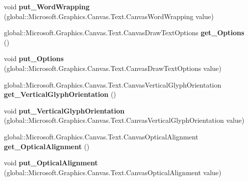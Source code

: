 \begin{DoxyCompactItemize}
void {\bfseries put\+\_\+\+Word\+Wrapping} (global\+::\+Microsoft.\+Graphics.\+Canvas.\+Text.\+Canvas\+Word\+Wrapping value)
\item 
\mbox{\label{interface_microsoft_1_1_graphics_1_1_canvas_1_1_text_1_1_i_canvas_text_format_a208378a52440f0dccacbf5a5208e2e6d}} 
global\+::\+Microsoft.\+Graphics.\+Canvas.\+Text.\+Canvas\+Draw\+Text\+Options {\bfseries get\+\_\+\+Options} ()
\item 
\mbox{\label{interface_microsoft_1_1_graphics_1_1_canvas_1_1_text_1_1_i_canvas_text_format_a2f0c996edcd441c91461fbf033bf1203}} 
void {\bfseries put\+\_\+\+Options} (global\+::\+Microsoft.\+Graphics.\+Canvas.\+Text.\+Canvas\+Draw\+Text\+Options value)
\item 
\mbox{\label{interface_microsoft_1_1_graphics_1_1_canvas_1_1_text_1_1_i_canvas_text_format_abc2a32d3aacea2f49232cd218d252da8}} 
global\+::\+Microsoft.\+Graphics.\+Canvas.\+Text.\+Canvas\+Vertical\+Glyph\+Orientation {\bfseries get\+\_\+\+Vertical\+Glyph\+Orientation} ()
\item 
\mbox{\label{interface_microsoft_1_1_graphics_1_1_canvas_1_1_text_1_1_i_canvas_text_format_a4f0382db5faf99e239642e76ec8e2269}} 
void {\bfseries put\+\_\+\+Vertical\+Glyph\+Orientation} (global\+::\+Microsoft.\+Graphics.\+Canvas.\+Text.\+Canvas\+Vertical\+Glyph\+Orientation value)
\item 
\mbox{\label{interface_microsoft_1_1_graphics_1_1_canvas_1_1_text_1_1_i_canvas_text_format_a6266ab0128ef88ed3a47c3b55f8d882a}} 
global\+::\+Microsoft.\+Graphics.\+Canvas.\+Text.\+Canvas\+Optical\+Alignment {\bfseries get\+\_\+\+Optical\+Alignment} ()
\item 
\mbox{\label{interface_microsoft_1_1_graphics_1_1_canvas_1_1_text_1_1_i_canvas_text_format_af5a78a267574fdae1a3a594f0d0e7d06}} 
void {\bfseries put\+\_\+\+Optical\+Alignment} (global\+::\+Microsoft.\+Graphics.\+Canvas.\+Text.\+Canvas\+Optical\+Alignment value)

\end{DoxyCompactItemize}
